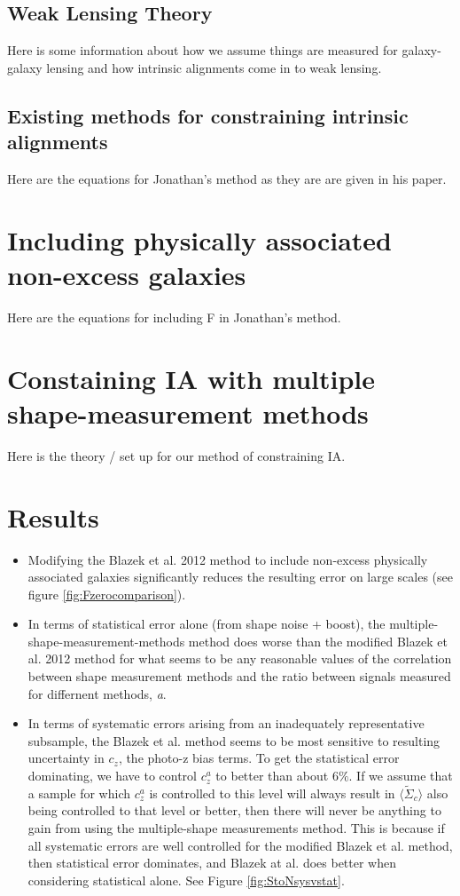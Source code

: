 \documentclass[twocolumn,amsmath,aps,fleqn, superscriptaddress]{revtex4}
\begin{document}
\subsection{Weak Lensing Theory}
\label{subsec:wltheory}
Here is some information about how we assume things are measured for galaxy-galaxy lensing and how intrinsic alignments come in to weak lensing.

\subsection{Existing methods for constraining intrinsic alignments}
\label{subsec:existingIA}
Here are the equations for Jonathan's method as they are are given in his paper.

\section{Including physically associated non-excess galaxies}
\label{sec:closerand}
Here are the equations for including F in Jonathan's method.

\section{Constaining IA with multiple shape-measurement methods}
\label{subsec:newmethod}
Here is the theory / set up for our method of constraining IA.


\section{Results}
\label{sec:results}
\noindent
\begin{itemize}
\item{Modifying the Blazek et al. 2012 method to include non-excess physically associated galaxies significantly reduces the resulting error on large scales (see figure \ref{fig:Fzerocomparison}).}
\item{In terms of statistical error alone (from shape noise + boost), the multiple-shape-measurement-methods method does worse than the modified Blazek et al. 2012 method for what seems to be any reasonable values of the correlation between shape measurement methods and the ratio between signals measured for differnent methods, {\it a}.}
\item{In terms of systematic errors arising from an inadequately representative subsample, the Blazek et al. method seems to be most sensitive to resulting uncertainty in $c_z$, the photo-z bias terms. To get the statistical error dominating, we have to control $c_z^a$ to better than about $6\%$. If we assume that a sample for which $c_z^a$ is controlled to this level will always result in $\langle \tilde{\Sigma}_c \rangle$ also being controlled to that level or better, then there will never be anything to gain from using the multiple-shape measurements method. This is because if all systematic errors are well controlled for the modified Blazek et al. method, then statistical error dominates, and Blazek at al. does better when considering statistical alone. See Figure \ref{fig:StoNsysvstat}.}
\end{itemize}
\end{document}

